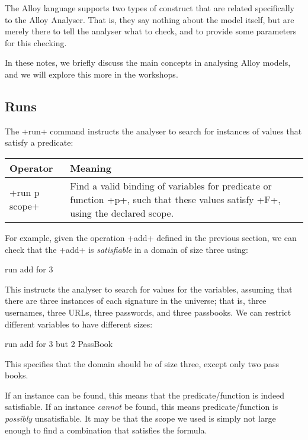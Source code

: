 The Alloy language supports two types of construct that are related specifically to the Alloy Analyser. That is, they say nothing about the model itself, but are merely there to tell the analyser what to check, and to provide some parameters for this checking.

In these notes, we briefly discuss the main concepts in analysing Alloy models, and we will explore this more in the workshops.


\subsection{Runs}

The \A+run+ command instructs the analyser to search for instances of values that satisfy a predicate:
\begin{center}
\begin{tabular}{lp{12.5cm}}
\toprule
 Operator & Meaning\\
\midrule
 \A+run p scope+ & Find a valid binding of variables for predicate or function \A+p+, such that these values satisfy \A+F+, using the declared scope.\\
\bottomrule
\end{tabular}
\end{center}

For example, given the operation \A+add+ defined in the previous section, we can check that the \A+add+ is \emph{satisfiable} in a domain of size three using:

\begin{alloy}
run add for 3
\end{alloy}

This instructs the analyser to search for values for the variables, assuming that there are three instances of each signature in the universe; that is, three usernames, three URLs, three passwords, and three passbooks. We can restrict different variables to have different sizes:

\begin{alloy}
run add for 3 but 2 PassBook
\end{alloy}

This specifies that the domain should be of size three, except only two pass books.

If an instance can be found, this means that the predicate/function is indeed satisfiable. If an instance \emph{cannot} be found, this means predicate/function is \emph{possibly} unsatisfiable. It may be that the scope we used is simply not large enough to find a combination that satisfies the formula.

